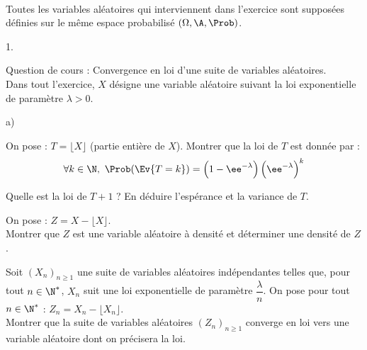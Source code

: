 
\begin{exerciceAP}~\\
Toutes les variables aléatoires qui interviennent dans l'exercice sont 
supposées définies sur le même espace probabilisé $(\Omega, 
\A,\Prob)$.
\begin{noliste}{1.}
    \setlength{\itemsep}{2mm}
  \item Question de cours : Convergence en loi d'une suite de variables 
  aléatoires.\\
  Dans tout l'exercice, $X$ désigne une variable aléatoire suivant la 
  loi exponentielle de paramètre $\lambda>0$.
  
  \item 
  \begin{noliste}{a)}
    \setlength{\itemsep}{2mm}
    \item On pose : $T=\lfloor X\rfloor$ (partie entière de $X$). 
    Montrer que la loi de $T$ est donnée par :
    \[
      \forall k \in\N, \ 
      \Prob(\Ev{T=k}) = \Big(1 - \ee^{-\lambda} \Big) \, 
      \Big(\ee^{-\lambda}\Big)^k
    \]
    
    \item Quelle est la loi de $T+1$ ? En déduire l'espérance et la 
    variance de $T$.
  \end{noliste}
  
  \item On pose : $Z=X-\lfloor X\rfloor$.\\
  Montrer que $Z$ est une variable aléatoire à densité et déterminer 
  une densité de $Z$.

  \item Soit $(X_n)_{n\geq 1}$ une suite de variables aléatoires 
  indépendantes telles que, pour tout $n\in\N^*$, $X_n$ suit une loi 
  exponentielle de paramètre $\dfrac{\lambda}{n}$. On pose pour tout 
  $n\in\N^*$ : $Z_n=X_n-\lfloor X_n\rfloor$.\\
  Montrer que la suite de variables aléatoires $(Z_n)_{n\geq 1}$ 
  converge en loi vers une variable aléatoire dont on précisera la loi.
\end{noliste}
\end{exerciceAP} 



